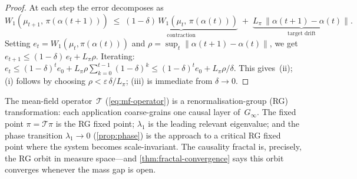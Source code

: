 \begin{proof}
At each step the error decomposes as
\[
  W_1(\mu_{t+1},\, \pi(\alpha(t{+}1)))
  \;\leq\;
  \underbrace{(1 - \delta)\,
    W_1(\mu_t,\, \pi(\alpha(t)))}_{\text{contraction}}
  \;+\;
  \underbrace{L_\pi\,
    \|\alpha(t{+}1) - \alpha(t)\|}_{\text{target drift}}.
\]
Setting $e_t = W_1(\mu_t, \pi(\alpha(t)))$ and
$\rho = \sup_t \|\alpha(t{+}1) - \alpha(t)\|$, we get
$e_{t+1} \leq (1 - \delta)\,e_t + L_\pi \rho$.
Iterating:
$e_t \leq (1-\delta)^t e_0 + L_\pi \rho
\sum_{k=0}^{t-1}(1-\delta)^k
\leq (1-\delta)^t e_0 + L_\pi \rho / \delta$.
This gives~(ii); (i) follows by choosing
$\rho < \varepsilon\,\delta / L_\pi$;
(iii) is immediate from $\delta \to 0$.
\end{proof}

\begin{remark}
\label{rem:rg}
The mean-field operator~$\mathcal{T}$
(\cref{eq:mf-operator}) is a renormalisation-group (RG)
transformation: each application coarse-grains one causal
layer of~$G_\infty$.  The fixed point
$\pi = \mathcal{T}\pi$ is the RG fixed point;
$\lambda_1$ is the leading relevant eigenvalue; and the
phase transition $\lambda_1 \to 0$
(\cref{prop:phase}) is the approach to a critical RG
fixed point where the system becomes scale-invariant.
The causality fractal is, precisely, the RG orbit in
measure space---and \cref{thm:fractal-convergence} says
this orbit converges whenever the mass gap is open.
\end{remark}
